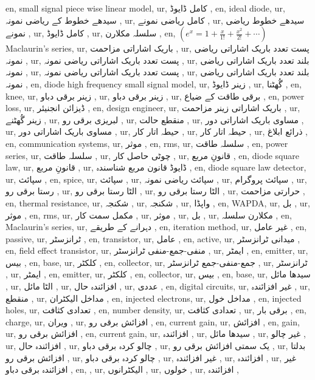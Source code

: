 en, small signal piece wise linear model,
ur, کامل ڈایوڈ ,
en, ideal diode,
ur, سیدھے خطوط کے ریاضی نمونہ ,
ur, کامل ریاضی نمونے ,
ur, سیدھے خطوط ریاضی نمونے ,
ur, کامل ڈایوڈ ,
ur, سلسلہ مکلارن ,
en, $\left (e^x=1+\frac {x}{1!}+\frac {x^2}{2!}+\cdots \right )$ Maclaurin's series,
ur, باریک اشاراتی مزاحمت ,
ur, پست تعدد باریک اشاراتی ریاضی نمونہ ,
ur, پست تعدد باریک اشاراتی ریاضی نمونہ ,
ur, بلند تعدد باریک اشاراتی ریاضی نمونہ ,
ur, پست تعدد باریک اشاراتی ریاضی نمونہ ,
ur, بلند تعدد باریک اشاراتی ریاضی نمونہ ,
en, diode high frequency small signal model,
ur, زینر ڈایوڈ ,
ur, گُھٹنا ,
en, knee,
ur, زینر برقی دباو ,
ur, زینر برقی دباو ,
ur, برقی طاقت کے ضیاع ,
en, power loss,
ur, ڈیزائن انجنیئر ,
en, design engineer,
ur, باریک اشاراتی زینر مزاحمت ,
ur, زینر گُھٹنے ,
ur, لبریزی برقی رو ,
ur, منقطع حالت ,
ur, مساوی باریک اشاراتی دور ,
ur, مساوی باریک اشاراتی دور ,
ur, حیطہ اتار کار ,
ur, حیطہ اتار کار ,
ur, ذرائع ابلاغ ,
en, communication systems,
ur, موثر ,
en, rms,
ur, سلسلہ طاقت ,
en, power series,
ur, سلسلہ طاقت ,
ur, چوٹی حاصل کار ,
ur, قانونِ مربع ,
en, diode square law,
ur, قانونِ مربع ,
ur, ڈایوڈ قانون مربع شناسندہ ,
en, diode square law detector,
ur, سپائث ,
en, spice,
ur, سپائث ,
ur, سپائث ریاضی نمونہ ,
ur, سپائث پروگرام ,
ur, رستا برقی رو ,
ur, الٹا رستا برقی رو ,
ur, الٹا رستا برقی رو ,
ur, حرارتی مزاحمت ,
en, thermal resistance,
ur, شکنجہ ,
ur, شکنجہ ,
ur, واپڈا ,
en, WAPDA,
ur, بل ,
ur, موثر ,
en, rms,
ur, مکمل سمت کار ,
ur, موثر ,
ur, بل ,
ur, مکلارن سلسلہ ,
en, Maclaurin's series,
ur, دہرانے کے طریقے ,
en, iteration method,
ur, غیر عامل ,
en, passive,
ur, ٹرانزسٹر ,
en, transistor,
ur, عامل ,
en, active,
ur, میدانی ٹرانزسٹر ,
en, field effect transistor,
ur, منفی-جمع-منفی ٹرانزسٹر ,
ur, ایمٹر ,
en, emitter,
ur, بیس ,
en, base,
ur, کلکٹر ,
en, collector,
ur, جمع-منفی-جمع ٹرانزسٹر ,
ur, ٹرانزسٹر ,
ur, ایمٹر ,
en, emitter,
ur, کلکٹر ,
en, collector,
ur, بیس ,
en, base,
ur, سیدھا مائل ,
ur, الٹا مائل ,
ur, افزائندہ حال ,
ur, عددی ,
en, digital circuits,
ur, غیر افزائندہ ,
ur, منقطع ,
ur, مداخل الیکٹران ,
en, injected electrons,
ur, مداخل خول ,
en, injected holes,
ur, تعدادی کثافت ,
en, number density,
ur, تعدادی کثافت ,
ur, برقی بار ,
en, charge,
ur, ویران ,
ur, افزائش برقی رو ,
en, current gain,
ur, افزائش ,
en, gain,
ur, افزائش برقی رو ,
en, current gain,
ur, افزائندہ ,
ur, سیدھا مائل ,
ur, غیر چالو ,
ur, افزائندہ حال ,
ur, چالو کردہ برقی دباو ,
ur, یک سمتی افزائش برقی رو ,
ur, بدلتا افزائش برقی رو ,
ur, چالو کردہ برقی دباو ,
ur, غیر افزائندہ ,
ur, افزائندہ ,
ur, غیر افزائندہ برقی دباو ,
en, ,
ur, الیکٹرانوں ,
ur, خولوں ,
ur, افزائندہ ,
